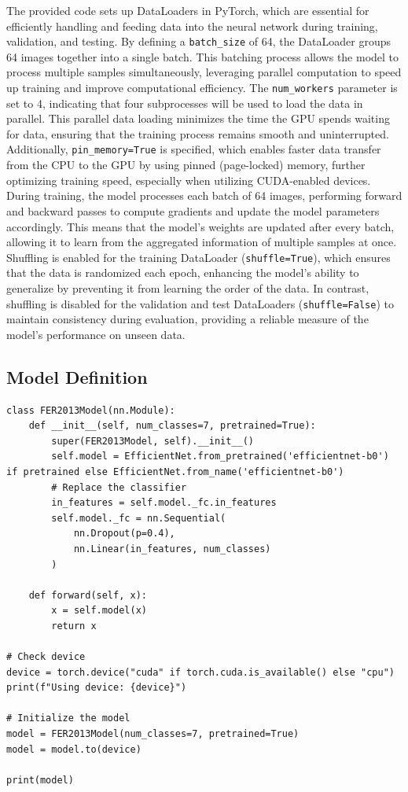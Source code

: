 \documentclass{article}
\begin{document}
The provided code sets up DataLoaders in PyTorch, which are essential for efficiently handling and feeding data into the neural network during training, validation, and testing. By defining a \texttt{batch\_size} of 64, the DataLoader groups 64 images together into a single batch. This batching process allows the model to process multiple samples simultaneously, leveraging parallel computation to speed up training and improve computational efficiency. The \texttt{num\_workers} parameter is set to 4, indicating that four subprocesses will be used to load the data in parallel. This parallel data loading minimizes the time the GPU spends waiting for data, ensuring that the training process remains smooth and uninterrupted. Additionally, \texttt{pin\_memory=True} is specified, which enables faster data transfer from the CPU to the GPU by using pinned (page-locked) memory, further optimizing training speed, especially when utilizing CUDA-enabled devices.
\\
During training, the model processes each batch of 64 images, performing forward and backward passes to compute gradients and update the model parameters accordingly. This means that the model's weights are updated after every batch, allowing it to learn from the aggregated information of multiple samples at once. Shuffling is enabled for the training DataLoader (\texttt{shuffle=True}), which ensures that the data is randomized each epoch, enhancing the model's ability to generalize by preventing it from learning the order of the data. In contrast, shuffling is disabled for the validation and test DataLoaders (\texttt{shuffle=False}) to maintain consistency during evaluation, providing a reliable measure of the model's performance on unseen data.

\subsection*{Model Definition}

\begin{verbatim}
class FER2013Model(nn.Module):
    def __init__(self, num_classes=7, pretrained=True):
        super(FER2013Model, self).__init__()
        self.model = EfficientNet.from_pretrained('efficientnet-b0') if pretrained else EfficientNet.from_name('efficientnet-b0')
        # Replace the classifier
        in_features = self.model._fc.in_features
        self.model._fc = nn.Sequential(
            nn.Dropout(p=0.4),
            nn.Linear(in_features, num_classes)
        )

    def forward(self, x):
        x = self.model(x)
        return x

# Check device
device = torch.device("cuda" if torch.cuda.is_available() else "cpu")
print(f"Using device: {device}")

# Initialize the model
model = FER2013Model(num_classes=7, pretrained=True)
model = model.to(device)

print(model)
\end{verbatim}
\end{document}
